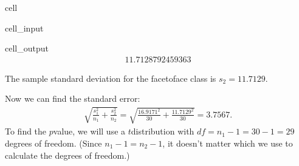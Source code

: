 \documentclass[letterpaper,10pt,english]{jupyterBook}
\begin{document}
\begin{sphinxuseclass}{cell}\begin{sphinxVerbatimInput}

\begin{sphinxuseclass}{cell_input}
\begin{sphinxVerbatim}[commandchars=\\\{\}]
\end{sphinxVerbatim}

\end{sphinxuseclass}\end{sphinxVerbatimInput}
\begin{sphinxVerbatimOutput}

\begin{sphinxuseclass}{cell_output}\begin{equation*}
\begin{split}11.7128792459363\end{split}
\end{equation*}
\end{sphinxuseclass}\end{sphinxVerbatimOutput}

\end{sphinxuseclass}
\sphinxAtStartPar
The sample standard deviation for the face\sphinxhyphen{}to\sphinxhyphen{}face class is \(s_2 = 11.7129\).

\sphinxAtStartPar
Now we can find the standard error:
\begin{equation*}
\begin{split} \sqrt{\frac{s_1^2}{n_1} + \frac{s_2^2}{n_2}} = \sqrt{\frac{16.9171^2}{30} + \frac{11.7129^2}{30}} = 3.7567. \end{split}
\end{equation*}
\sphinxAtStartPar
To find the \(p\)\sphinxhyphen{}value, we will use a \(t\)\sphinxhyphen{}distribution with \(df = n_1 - 1 = 30 - 1 = 29\) degrees of freedom. (Since \(n_1 - 1 = n_2 - 1\), it doesn’t matter which we use to calculate the degrees of freedom.)
\end{document}

